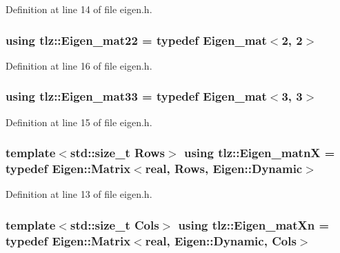 Definition at line 14 of file eigen.\+h.

\subsubsection[{\texorpdfstring{Eigen\+\_\+mat22}{Eigen_mat22}}]{\setlength{\rightskip}{0pt plus 5cm}using {\bf tlz\+::\+Eigen\+\_\+mat22} = typedef {\bf Eigen\+\_\+mat}$<$2, 2$>$}\hypertarget{namespacetlz_adf3b774ce3c9b66055cfa9ca2aca5bbd}{}\label{namespacetlz_adf3b774ce3c9b66055cfa9ca2aca5bbd}


Definition at line 16 of file eigen.\+h.

\subsubsection[{\texorpdfstring{Eigen\+\_\+mat33}{Eigen_mat33}}]{\setlength{\rightskip}{0pt plus 5cm}using {\bf tlz\+::\+Eigen\+\_\+mat33} = typedef {\bf Eigen\+\_\+mat}$<$3, 3$>$}\hypertarget{namespacetlz_afee79ad04dc384cb36b98f258f24d8cd}{}\label{namespacetlz_afee79ad04dc384cb36b98f258f24d8cd}


Definition at line 15 of file eigen.\+h.

\subsubsection[{\texorpdfstring{Eigen\+\_\+matnX}{Eigen_matnX}}]{\setlength{\rightskip}{0pt plus 5cm}template$<$std\+::size\+\_\+t Rows$>$ using {\bf tlz\+::\+Eigen\+\_\+matnX} = typedef Eigen\+::\+Matrix$<${\bf real}, Rows, Eigen\+::\+Dynamic$>$}\hypertarget{namespacetlz_a103ecb11ac4d0ca5c9acecd23adf1c4b}{}\label{namespacetlz_a103ecb11ac4d0ca5c9acecd23adf1c4b}


Definition at line 13 of file eigen.\+h.

\subsubsection[{\texorpdfstring{Eigen\+\_\+mat\+Xn}{Eigen_matXn}}]{\setlength{\rightskip}{0pt plus 5cm}template$<$std\+::size\+\_\+t Cols$>$ using {\bf tlz\+::\+Eigen\+\_\+mat\+Xn} = typedef Eigen\+::\+Matrix$<${\bf real}, Eigen\+::\+Dynamic, Cols$>$}\hypertarget{namespacetlz_ac64657248b5121a45ab176d28045b323}{}\label{namespacetlz_ac64657248b5121a45ab176d28045b323}


